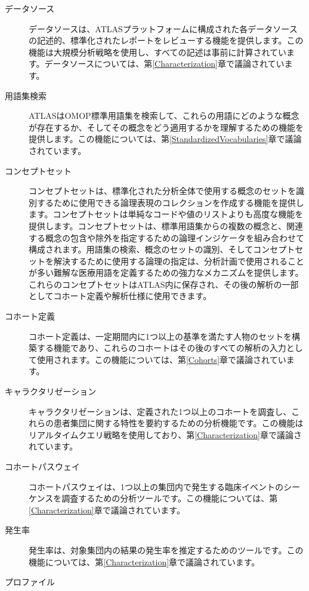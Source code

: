 \documentclass[
  11pt]{book}
\theoremstyle{definition}
\theoremstyle{definition}
\theoremstyle{definition}
\theoremstyle{definition}
\theoremstyle{remark}
\begin{document}
\begin{description}
\item[データソース  ]
データソースは、ATLASプラットフォームに構成された各データソースの記述的、標準化されたレポートをレビューする機能を提供します。この機能は大規模分析戦略を使用し、すべての記述は事前に計算されています。データソースについては、第\ref{Characterization}章で議論されています。
\item[用語集検索 ]
ATLASはOMOP標準用語集を検索して、これらの用語にどのような概念が存在するか、そしてその概念をどう適用するかを理解するための機能を提供します。この機能については、第\ref{StandardizedVocabularies}章で議論されています。
\item[コンセプトセット ]
コンセプトセットは、標準化された分析全体で使用する概念のセットを識別するために使用できる論理表現のコレクションを作成する機能を提供します。コンセプトセットは単純なコードや値のリストよりも高度な機能を提供します。コンセプトセットは、標準用語集からの複数の概念と、関連する概念の包含や除外を指定するための論理インジケータを組み合わせて構成されます。用語集の検索、概念のセットの識別、そしてコンセプトセットを解決するために使用する論理の指定は、分析計画で使用されることが多い難解な医療用語を定義するための強力なメカニズムを提供します。これらのコンセプトセットはATLAS内に保存され、その後の解析の一部としてコホート定義や解析仕様に使用できます。
\item[コホート定義 ]
コホート定義は、一定期間内に1つ以上の基準を満たす人物のセットを構築する機能であり、これらのコホートはその後のすべての解析の入力として使用されます。この機能については、第\ref{Cohorts}章で議論されています。
\item[キャラクタリゼーション ]
キャラクタリゼーションは、定義された1つ以上のコホートを調査し、これらの患者集団に関する特性を要約するための分析機能です。この機能はリアルタイムクエリ戦略を使用しており、第\ref{Characterization}章で議論されています。
\item[コホートパスウェイ ]
コホートパスウェイは、1つ以上の集団内で発生する臨床イベントのシーケンスを調査するための分析ツールです。この機能については、第\ref{Characterization}章で議論されています。
\item[発生率 ]
発生率は、対象集団内の結果の発生率を推定するためのツールです。この機能については、第\ref{Characterization}章で議論されています。
\item[プロファイル ]

\end{description}
\end{document}
